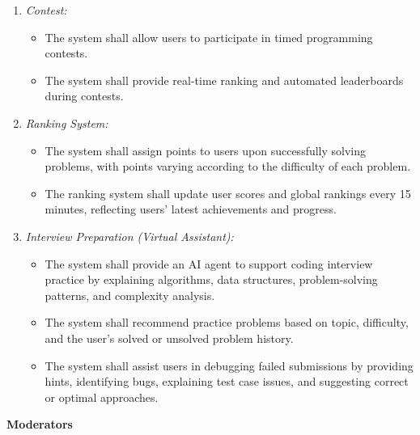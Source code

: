 \begin{enumerate}[label=\arabic*.]
\begin{itemize}
        \end{itemize}
    \item \textit{Contest:}
        \begin{itemize}
            \item The system shall allow users to participate in timed programming contests.
            \item The system shall provide real-time ranking and automated leaderboards during contests.
        \end{itemize}
    \item \textit{Ranking System:}
        \begin{itemize}
            \item The system shall assign points to users upon successfully solving problems, with points varying according to the difficulty of each problem.
            \item The ranking system shall update user scores and global rankings every 15 minutes, reflecting users’ latest achievements and progress.
        \end{itemize}
    \item \textit{Interview Preparation (Virtual Assistant):}
        \begin{itemize}
            \item The system shall provide an AI agent to support coding interview practice by explaining algorithms, data structures, problem-solving patterns, and complexity analysis.
            \item The system shall recommend practice problems based on topic, difficulty, and the user's solved or unsolved problem history.
            \item The system shall assist users in debugging failed submissions by providing hints, identifying bugs, explaining test case issues, and suggesting correct or optimal approaches.
        \end{itemize}
\end{enumerate}
\vspace{0.3cm}
\noindent \textbf{\Large Moderators}
\vspace{0.3cm}
